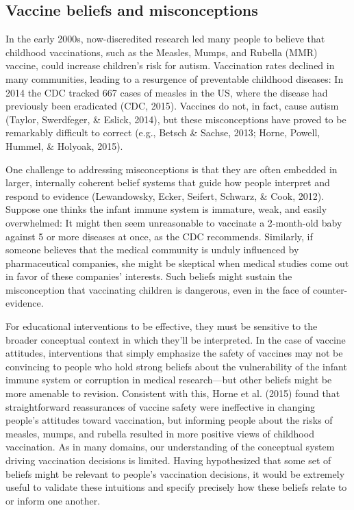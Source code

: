 \documentclass[10pt, letterpaper]{article}
\begin{document}
\subsection{Vaccine beliefs and
misconceptions}\label{vaccine-beliefs-and-misconceptions}

In the early 2000s, now-discredited research led many people to believe
that childhood vaccinations, such as the Measles, Mumps, and Rubella
(MMR) vaccine, could increase children's risk for autism. Vaccination
rates declined in many communities, leading to a resurgence of
preventable childhood diseases: In 2014 the CDC tracked 667 cases of
measles in the US, where the disease had previously been eradicated
(CDC, 2015). Vaccines do not, in fact, cause autism (Taylor, Swerdfeger,
\& Eslick, 2014), but these misconceptions have proved to be remarkably
difficult to correct (e.g., Betsch \& Sachse, 2013; Horne, Powell,
Hummel, \& Holyoak, 2015).

One challenge to addressing misconceptions is that they are often
embedded in larger, internally coherent belief systems that guide how
people interpret and respond to evidence (Lewandowsky, Ecker, Seifert,
Schwarz, \& Cook, 2012). Suppose one thinks the infant immune system is
immature, weak, and easily overwhelmed: It might then seem unreasonable
to vaccinate a 2-month-old baby against 5 or more diseases at once, as
the CDC recommends. Similarly, if someone believes that the medical
community is unduly influenced by pharmaceutical companies, she might be
skeptical when medical studies come out in favor of these companies'
interests. Such beliefs might sustain the misconception that vaccinating
children is dangerous, even in the face of counter-evidence.

For educational interventions to be effective, they must be sensitive to
the broader conceptual context in which they'll be interpreted. In the
case of vaccine attitudes, interventions that simply emphasize the
safety of vaccines may not be convincing to people who hold strong
beliefs about the vulnerability of the infant immune system or
corruption in medical research---but other beliefs might be more
amenable to revision. Consistent with this, Horne et al. (2015) found
that straightforward reassurances of vaccine safety were ineffective in
changing people's attitudes toward vaccination, but informing people
about the risks of measles, mumps, and rubella resulted in more positive
views of childhood vaccination. As in many domains, our understanding of
the conceptual system driving vaccination decisions is limited. Having
hypothesized that some set of beliefs might be relevant to people's
vaccination decisions, it would be extremely useful to validate these
intuitions and specify precisely how these beliefs relate to or inform
one another.
\end{document}
